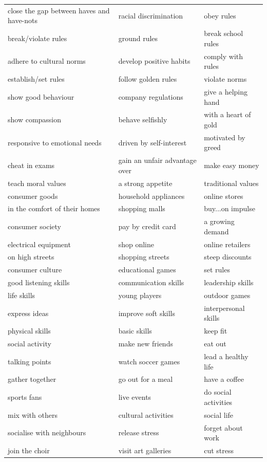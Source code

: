 \documentclass[10pt,a4paper]{article}
\begin{document}
{\begin{longtable}{@{}*{3}{p{}}@{}}
close the gap between haves and have-nots & racial discrimination & obey rules \\
break/violate rules & ground rules & break school rules \\
adhere to cultural norms & develop positive habits & comply with rules \\
establish/set rules & follow golden rules & violate norms \\
show good behaviour & company regulations & give a helping hand \\
show compassion & behave selfishly & with a heart of gold \\
responsive to emotional needs & driven by self-interest & motivated by greed \\
cheat in exams & gain an unfair advantage over & make easy money \\
teach moral values & a strong appetite & traditional values \\
consumer goods & household appliances & online stores \\
in the comfort of their homes & shopping malls & buy...on impulse \\
consumer society & pay by credit card & a growing demand \\
electrical equipment & shop online & online retailers \\
on high streets & shopping streets & steep discounts \\
consumer culture & educational games & set rules \\
good listening skills & communication skills & leadership skills \\
life skills & young players & outdoor games \\
express ideas & improve soft skills & interpersonal skills \\
physical skills & basic skills & keep fit \\
social activity & make new friends & eat out \\
talking points & watch soccer games & lead a healthy life \\
gather together & go out for a meal & have a coffee \\
sports fans & live events & do social activities \\
mix with others & cultural activities & social life \\
socialise with neighbours & release stress & forget about work \\
join the choir & visit art galleries & cut stress \\

\end{longtable}}
\end{document}
